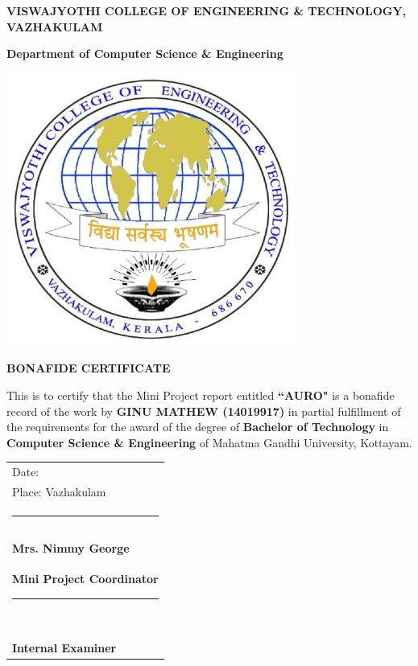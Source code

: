 \documentclass[11pt]{report}
\begin{document}
\newpage
\thispagestyle{empty}
    \begin{center}
        
        \large
        \textbf{VISWAJYOTHI COLLEGE OF ENGINEERING \& TECHNOLOGY, VAZHAKULAM}
        
        \vspace{.4cm}
        \large \textbf{Department of Computer Science \& Engineering }
        
		\vspace{0.4cm}        
        
        \includegraphics{vjcet.jpg}
        
        \vspace{0.8cm}
        
        \large \textbf{BONAFIDE CERTIFICATE}
        \vspace{0.4cm}
    \end{center}
This is to certify that the Mini Project report entitled \textbf{``AURO"} is a bonafide record of the work by \textbf{GINU MATHEW (14019917)} in partial fulfillment of the requirements for the award of the degree of \textbf{Bachelor of Technology} in \textbf{Computer Science \& Engineering} of Mahatma Gandhi University, Kottayam.
\vspace{1 cm}
\\
\begin{tabular}[t]{@{}l}
Date:\\
Place: Vazhakulam\\
\rule{1cm}{0cm}\\ \\ \\
\textbf{Mrs. Nimmy George} \\
\textbf{Mini Project Coordinator}
\rule{1cm}{0cm}\\ \\ \\ \\ \\ \\ \\
\textbf{Internal Examiner}
\end{tabular}
\end{document}

